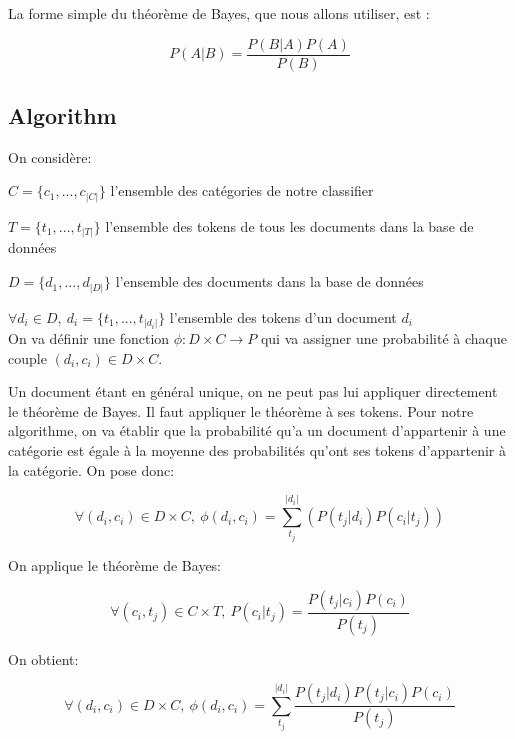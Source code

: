 \documentclass[a4paper,11pt]{article}
\begin{document}
La forme simple du théorème de Bayes, que nous allons utiliser, est :

\begin{equation}
    P(A| B) = \frac{P(B | A) P(A)}{P(B)}
\end{equation}


\subsection{Algorithm}

On considère:

$C = \{c_1, ..., c_{|C|}\}$ l'ensemble des catégories de notre classifier

$T = \{t_1, ..., t_{|T|}\}$ l'ensemble des tokens de tous les documents dans la base de données

$D = \{d_1, ..., d_{|D|}\}$ l'ensemble des documents dans la base de données

$\forall d_i \in D,\ d_i = \{t_1, ..., t_{|d_i|}\}$ l'ensemble des tokens d'un document $d_i$
~\\

On va définir une fonction $\phi : D \times C \rightarrow P$ qui va assigner une probabilité à chaque couple
$(d_i, c_i) \in D \times C$.

Un document étant en général unique, on ne peut pas lui appliquer directement
le théorème de Bayes. Il faut appliquer le théorème à ses tokens. Pour notre
algorithme, on va établir que la probabilité qu'a un document d'appartenir à
une catégorie est égale à la moyenne des probabilités qu'ont ses tokens
d'appartenir à la catégorie. On pose donc:

\begin{equation}
    \forall (d_i, c_i) \in D \times C,\ 
    \phi(d_i, c_i)
    = \sum_{t_j}^{|d_i|} (P(t_j | d_i) P(c_i | t_j))
\end{equation}

On applique le théorème de Bayes:

\begin{equation}
    \forall (c_i, t_j) \in C \times T,\ 
    P(c_i| t_j)
    = \frac{P(t_j | c_i) P(c_i)}{P(t_j)}
\end{equation}

On obtient:

\begin{equation}\label{eq:final_prob}
    \forall (d_i, c_i) \in D \times C,\ 
    \phi(d_i, c_i)
    = \sum_{t_j}^{|d_i|} \frac{P(t_j | d_i) P(t_j | c_i) P(c_i)}{P(t_j)}
\end{equation}
\end{document}
